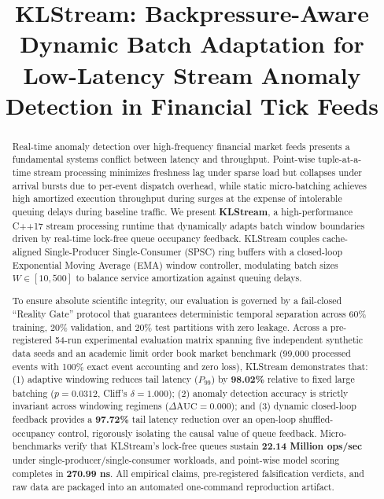 \documentclass[conference,10pt]{IEEEtran}
\begin{document}
\title{KLStream: Backpressure-Aware Dynamic Batch Adaptation for Low-Latency Stream Anomaly Detection in Financial Tick Feeds}

\author{
}

\maketitle

\begin{abstract}
Real-time anomaly detection over high-frequency financial market feeds presents a fundamental systems conflict between latency and throughput. Point-wise tuple-at-a-time stream processing minimizes freshness lag under sparse load but collapses under arrival bursts due to per-event dispatch overhead, while static micro-batching achieves high amortized execution throughput during surges at the expense of intolerable queuing delays during baseline traffic. We present \textbf{KLStream}, a high-performance C++17 stream processing runtime that dynamically adapts batch window boundaries driven by real-time lock-free queue occupancy feedback. KLStream couples cache-aligned Single-Producer Single-Consumer (SPSC) ring buffers with a closed-loop Exponential Moving Average (EMA) window controller, modulating batch sizes $W \in [10, 500]$ to balance service amortization against queuing delays. 

To ensure absolute scientific integrity, our evaluation is governed by a fail-closed ``Reality Gate'' protocol that guarantees deterministic temporal separation across 60\% training, 20\% validation, and 20\% test partitions with zero leakage. Across a pre-registered 54-run experimental evaluation matrix spanning five independent synthetic data seeds and an academic limit order book market benchmark (99,000 processed events with 100\% exact event accounting and zero loss), KLStream demonstrates that: (1) adaptive windowing reduces tail latency ($P_{99}$) by \textbf{98.02\%} relative to fixed large batching ($p = 0.0312$, Cliff's $\delta = 1.000$); (2) anomaly detection accuracy is strictly invariant across windowing regimens ($\Delta\text{AUC} = 0.000$); and (3) dynamic closed-loop feedback provides a \textbf{97.72\%} tail latency reduction over an open-loop shuffled-occupancy control, rigorously isolating the causal value of queue feedback. Micro-benchmarks verify that KLStream's lock-free queues sustain \textbf{22.14 Million ops/sec} under single-producer/single-consumer workloads, and point-wise model scoring completes in \textbf{270.99 ns}. All empirical claims, pre-registered falsification verdicts, and raw data are packaged into an automated one-command reproduction artifact.
\end{abstract}
\end{document}
